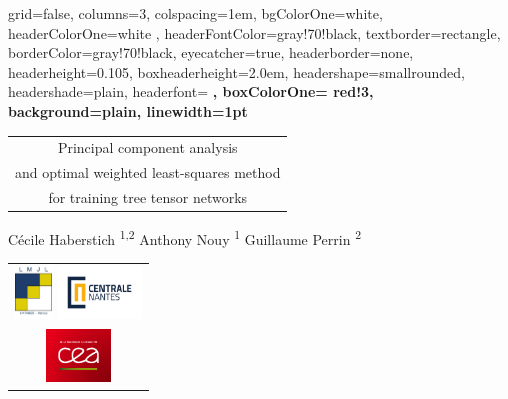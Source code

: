 \documentclass[portrait,a0paper]{baposter}
\begin{document}
\begin{poster}%
{
	grid=false,
	columns=3,
	colspacing=1em,
	bgColorOne=white,
	headerColorOne=white ,%
	headerFontColor=gray!70!black, %
	textborder=rectangle,
	borderColor=gray!70!black,
	eyecatcher=true,
	headerborder=none,
	headerheight=0.105\textheight,
	boxheaderheight=2.0em,
	headershape=smallrounded,
	headershade=plain,
	headerfont=\vphantom{\Huge X} \large\bfseries, %
	boxColorOne= red!3,%
	background=plain,
	linewidth=1pt
}
{
	
 }
{\bf  \begin{tabular}{c} \color{black!85} Principal component analysis \\ \color{black!85} and optimal weighted least-squares method\\ \color{black!85} for training tree tensor networks\end{tabular}}
{\hfill Cécile Haberstich \textsuperscript{1,2 \dag} \hfill Anthony Nouy \textsuperscript{1} \hfill Guillaume Perrin \textsuperscript{2} \hfill \vphantom{A}}
{
	\begin{tabular}{c}
		\includegraphics[height=1.4cm]{LogoLMJL} \includegraphics[height=1.4cm]{logocentrale}\\
		\hspace{-0.6cm}\includegraphics[height=1.4cm]{logoCEA}\\
	\end{tabular}
}


\end{poster}
\end{document}
